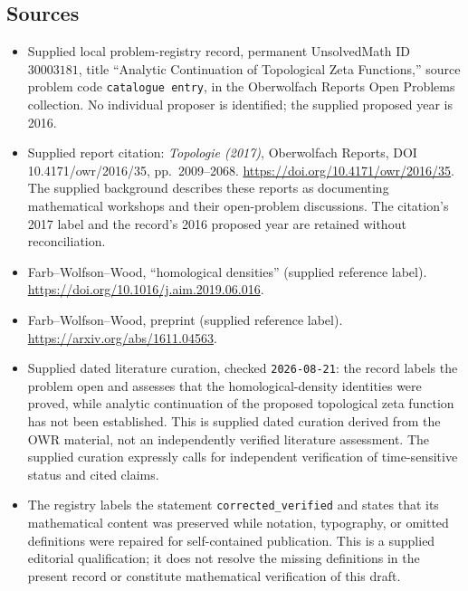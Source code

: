 \documentclass[11pt]{article}
\begin{document}
\subsection{Sources}
\begin{itemize}
\item Supplied local problem-registry record, permanent UnsolvedMath ID \(30003181\), title ``Analytic Continuation of Topological Zeta Functions,'' source problem code \texttt{catalogue entry}, in the Oberwolfach Reports Open Problems collection. No individual proposer is identified; the supplied proposed year is 2016.
\item Supplied report citation: \emph{Topologie (2017)}, Oberwolfach Reports, DOI 10.4171/owr/2016/35, pp.\ 2009--2068. \url{https://doi.org/10.4171/owr/2016/35}. The supplied background describes these reports as documenting mathematical workshops and their open-problem discussions. The citation's 2017 label and the record's 2016 proposed year are retained without reconciliation.
\item Farb--Wolfson--Wood, ``homological densities'' (supplied reference label). \url{https://doi.org/10.1016/j.aim.2019.06.016}.
\item Farb--Wolfson--Wood, preprint (supplied reference label). \url{https://arxiv.org/abs/1611.04563}.
\item Supplied dated literature curation, checked \texttt{2026-08-21}: the record labels the problem open and assesses that the homological-density identities were proved, while analytic continuation of the proposed topological zeta function has not been established. This is supplied dated curation derived from the OWR material, not an independently verified literature assessment. The supplied curation expressly calls for independent verification of time-sensitive status and cited claims.
\item The registry labels the statement \texttt{corrected\_verified} and states that its mathematical content was preserved while notation, typography, or omitted definitions were repaired for self-contained publication. This is a supplied editorial qualification; it does not resolve the missing definitions in the present record or constitute mathematical verification of this draft.
\end{itemize}
\end{document}
